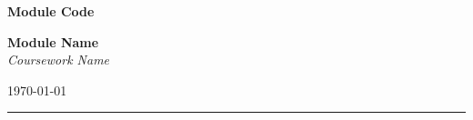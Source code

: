 
\thispagestyle{empty}
	
\begin{center}
\vspace{0.2cm}

\huge
\textbf{Module Code}
\vspace{0.2cm}

\Large
\textbf{Module Name}\\
\textit{Coursework Name}

\vspace{0.2cm}
\today
\par\noindent\rule{\textwidth}{0.4pt}
\vspace{0.1cm}



\end{center}

\newpage